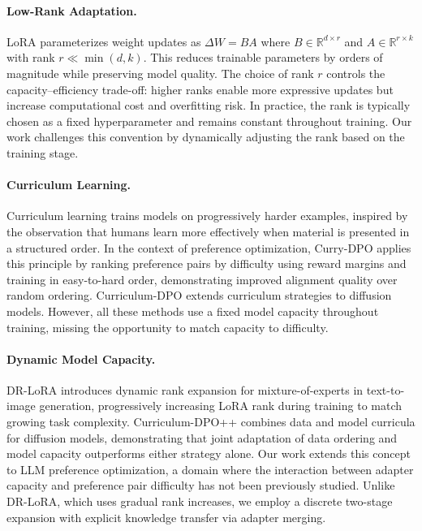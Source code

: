 \documentclass{article}
\begin{document}
\paragraph{Low-Rank Adaptation.}
LoRA \citep{hu2022lora} parameterizes weight updates as $\Delta W = BA$ where $B \in \mathbb{R}^{d \times r}$ and $A \in \mathbb{R}^{r \times k}$ with rank $r \ll \min(d, k)$. This reduces trainable parameters by orders of magnitude while preserving model quality. The choice of rank $r$ controls the capacity--efficiency trade-off: higher ranks enable more expressive updates but increase computational cost and overfitting risk. In practice, the rank is typically chosen as a fixed hyperparameter and remains constant throughout training. Our work challenges this convention by dynamically adjusting the rank based on the training stage.

\paragraph{Curriculum Learning.}
Curriculum learning \citep{bengio2009curriculum} trains models on progressively harder examples, inspired by the observation that humans learn more effectively when material is presented in a structured order. In the context of preference optimization, Curry-DPO \citep{pattnaik2024currydpo} applies this principle by ranking preference pairs by difficulty using reward margins and training in easy-to-hard order, demonstrating improved alignment quality over random ordering. Curriculum-DPO \citep{croitoru2024curriculum} extends curriculum strategies to diffusion models. However, all these methods use a fixed model capacity throughout training, missing the opportunity to match capacity to difficulty.

\paragraph{Dynamic Model Capacity.}
DR-LoRA \citep{deng2026drlora} introduces dynamic rank expansion for mixture-of-experts in text-to-image generation, progressively increasing LoRA rank during training to match growing task complexity. Curriculum-DPO++ \citep{croitoru2026curriculumdpo} combines data and model curricula for diffusion models, demonstrating that joint adaptation of data ordering and model capacity outperforms either strategy alone. Our work extends this concept to LLM preference optimization, a domain where the interaction between adapter capacity and preference pair difficulty has not been previously studied. Unlike DR-LoRA, which uses gradual rank increases, we employ a discrete two-stage expansion with explicit knowledge transfer via adapter merging.
\end{document}
